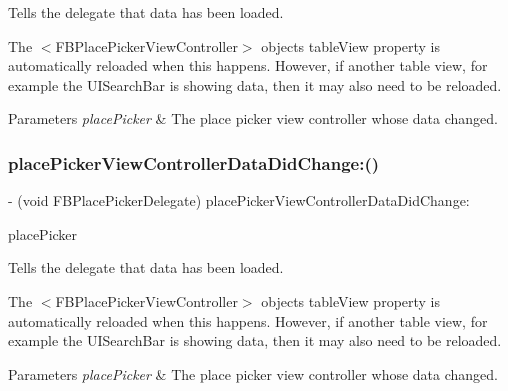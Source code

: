 Tells the delegate that data has been loaded.

The $<$\+F\+B\+Place\+Picker\+View\+Controller$>$ object\textquotesingle{}s {\ttfamily table\+View} property is automatically reloaded when this happens. However, if another table view, for example the {\ttfamily U\+I\+Search\+Bar} is showing data, then it may also need to be reloaded.


\begin{DoxyParams}{Parameters}
{\em place\+Picker} & The place picker view controller whose data changed. \\
\hline
\end{DoxyParams}
\mbox{\label{protocolFBPlacePickerDelegate_01-p_aaa234bae2ec98cf414ef201da6264c67}} 
\subsubsection{\texorpdfstring{place\+Picker\+View\+Controller\+Data\+Did\+Change\+:()}{placePickerViewControllerDataDidChange:()}\hspace{0.1cm}{\footnotesize\ttfamily [4/5]}}
{\footnotesize\ttfamily -\/ (void F\+B\+Place\+Picker\+Delegate) place\+Picker\+View\+Controller\+Data\+Did\+Change\+: \begin{DoxyParamCaption}\item[{(\hyperlink{interfaceFBPlacePickerViewController}{F\+B\+Place\+Picker\+View\+Controller} $\ast$)}]{place\+Picker }\end{DoxyParamCaption}\hspace{0.3cm}{\ttfamily [optional]}}

Tells the delegate that data has been loaded.

The $<$\+F\+B\+Place\+Picker\+View\+Controller$>$ object\textquotesingle{}s {\ttfamily table\+View} property is automatically reloaded when this happens. However, if another table view, for example the {\ttfamily U\+I\+Search\+Bar} is showing data, then it may also need to be reloaded.


\begin{DoxyParams}{Parameters}
{\em place\+Picker} & The place picker view controller whose data changed. \\
\hline
\end{DoxyParams}
\mbox{\label{protocolFBPlacePickerDelegate_01-p_aaa234bae2ec98cf414ef201da6264c67}} 

